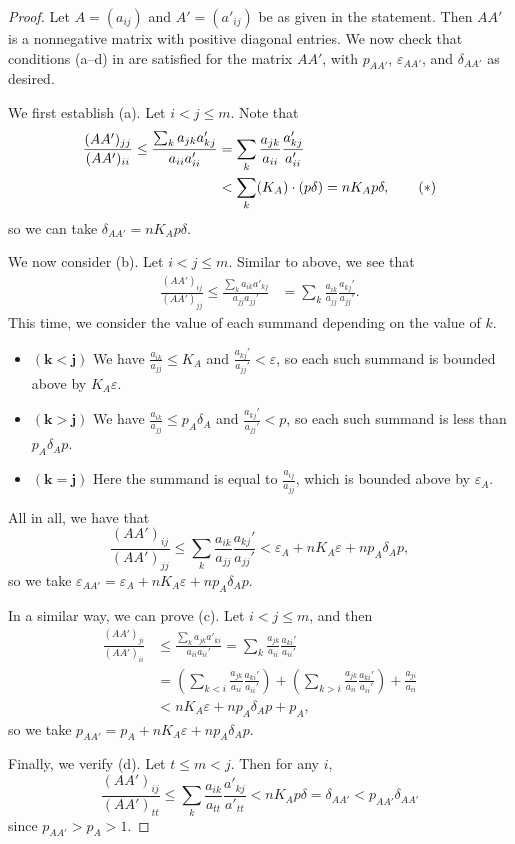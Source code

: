 \documentclass[11pt, letterpaper]{amsart}
\theoremstyle{plain}
\theoremstyle{definition}
\renewcommand{\epsilon}{\varepsilon}
\newcommand{\eps}{\epsilon}
\begin{document}
\begin{proof}
  Let $A=(a_{ij})$ and $A'=(a'_{ij})$ be as given in the statement. Then $AA'$
  is a nonnegative matrix with positive diagonal entries. 
  We now check that conditions (a--d) in  are satisfied for the matrix $AA'$, with $p_{AA'}$, $\eps_{AA'}$, and $\delta_{AA'}$ as desired.

  We first establish (a). Let $i < j\leq m$. Note that
  \begin{align}
    \frac{(AA')_{jj}}{(AA')_{ii}} \le \frac{\sum_{k}a_{jk}a'_{kj}}{a_{ii}a_{ii}'}
    &= \sum_{k} \frac{a_{jk}}{a_{ii}} \frac{a_{kj}'}{a_{ii}'}\notag\\
    &< \sum_{k} (K_A) \cdot (p\delta) =nK_Ap\delta,\tag{$\ast$}
  \end{align}
  so we can take $\delta_{AA'} = nK_Ap\delta$.

  We now consider (b). Let $i < j\leq m$. Similar to above, we see that
  \begin{align*}
    \frac{(AA')_{ij}}{(AA')_{jj}} \le \frac{\sum_{k}a_{ik}a'_{kj}}{a_{jj}a_{jj}'}
    &= \sum_{k} \frac{a_{ik}}{a_{jj}} \frac{a_{kj}'}{a_{jj}'}.
  \end{align*}
  This time, we consider the value of each summand depending on the value of $k$.  
  \begin{itemize}
  \item $\mathbf{(k<j)}$ We have 
    $\frac{a_{ik}}{a_{jj}} \le  K_A$ and $\frac{a_{kj}'}{a_{jj}'} < \eps$, so
    each such summand is bounded above by $K_A \eps$.
  \item $\mathbf{(k>j)}$ We have 
    $\frac{a_{ik}}{a_{jj}} \le p_A\delta_A$ and $\frac{a_{kj}'}{a_{jj}'} < p$, so
    each such summand is less than $p_A\delta_Ap$.
  \item $\mathbf{(k=j)}$ Here the summand is equal to $\frac{a_{ij}}{a_{jj}}$,
    which is bounded above by $\eps_A$.
  \end{itemize}
  All in all, we have that 
  \[
    \frac{(AA')_{ij}}{(AA')_{jj}} \le \sum_{k} \frac{a_{ik}}{a_{jj}}
    \frac{a_{kj}'}{a_{jj}'} < \eps_A + nK_A\eps + np_A\delta_Ap,
  \]
  so we take $\eps_{AA'} = \eps_A + nK_A\eps + np_A\delta_Ap$.

  In a similar way, we can prove (c). Let $i< j\leq m$, and then
  \begin{align*}
    \frac{(AA')_{ji}}{(AA')_{ii}} &\le \frac{\sum_{k}a_{jk}a'_{ki}}{a_{ii}a_{ii}'}
    = \sum_{k} \frac{a_{jk}}{a_{ii}} \frac{a_{ki}'}{a_{ii}'} \\
    &= \left(  \sum_{k<i} \frac{a_{jk}}{a_{ii}} \frac{a_{ki}'}{a_{ii}'} \right) + \left( \sum_{k>i} \frac{a_{jk}}{a_{ii}} \frac{a_{ki}'}{a_{ii}'}\right) + \frac{a_{ji}}{a_{ii}}\\
    &< nK_A\eps + np_A\delta_Ap + p_A,
  \end{align*}
  so we take $p_{AA'} = p_A + nK_A\eps + np_A\delta_Ap$.

  Finally, we verify (d). Let $t \le m <j$.
  Then for any $i$,
  \[
    \frac{(AA')_{ij}}{(AA')_{tt}} \le \sum_{k} \frac{a_{ik}}{a_{tt}}
    \frac{a'_{kj}}{a'_{tt}} < nK_Ap\delta = \delta_{AA'}< p_{AA'}\delta_{AA'}
  \]
  since $p_{AA'}>p_A>1$. 
\end{proof}
\end{document}
